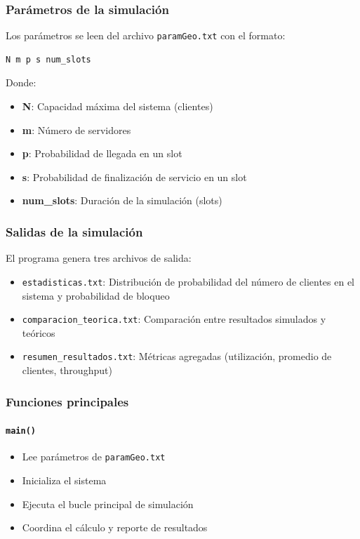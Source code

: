 \documentclass{article}
\begin{document}
\subsubsection{Parámetros de la simulación}

Los parámetros se leen del archivo \texttt{paramGeo.txt} con el formato:

\begin{verbatim}
N m p s num_slots
\end{verbatim}

Donde:
\begin{itemize}
    \item \textbf{N}: Capacidad máxima del sistema (clientes)
    \item \textbf{m}: Número de servidores
    \item \textbf{p}: Probabilidad de llegada en un slot
    \item \textbf{s}: Probabilidad de finalización de servicio en un slot
    \item \textbf{num\_slots}: Duración de la simulación (slots)
\end{itemize}

\subsubsection{Salidas de la simulación}

El programa genera tres archivos de salida:

\begin{itemize}
    \item \texttt{estadisticas.txt}: Distribución de probabilidad del número de clientes en el sistema y probabilidad de bloqueo
    \item \texttt{comparacion\_teorica.txt}: Comparación entre resultados simulados y teóricos
    \item \texttt{resumen\_resultados.txt}: Métricas agregadas (utilización, promedio de clientes, throughput)
\end{itemize}

\subsubsection{Funciones principales}

\paragraph{\texttt{main()}}
\begin{itemize}
    \item Lee parámetros de \texttt{paramGeo.txt}
    \item Inicializa el sistema
    \item Ejecuta el bucle principal de simulación
    \item Coordina el cálculo y reporte de resultados
\end{itemize}
\end{document}
